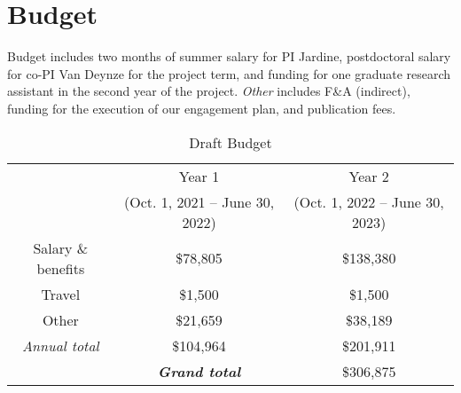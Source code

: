 \documentclass[12pt]{elsarticle}
\begin{document}
	\section{Budget}
	Budget includes two months of summer salary for PI Jardine, postdoctoral salary for co-PI Van Deynze for the project term, and funding for one graduate research assistant in the second year of the project. \textit{Other} includes F\&A (indirect), funding for the execution of our engagement plan,  and publication fees.
	
		\begin{table}[h]
				\caption{Draft Budget} 	
			\centering
				\begin{tabular}{ c|cc } %
			\hline
			 & Year 1  & Year 2  \\
			 & (Oct. 1, 2021 -- June 30, 2022) & (Oct. 1, 2022 -- June 30, 2023) \\
			 \hline
			\rowcolor[gray]{.9} Salary \& benefits &  \$78,805  & \$138,380 \\ 
			Travel & \$1,500 & \$1,500 \\
			\rowcolor[gray]{.9} Other & \$21,659 & \$38,189 \\
			\hline
			\textit{Annual total} & \$104,964 & \$201,911 \\
			\hline
			& \textbf{\textit{Grand total}} & \$306,875 \\
			\hline
		\end{tabular}
	\end{table}

	
	
	
	\clearpage
	\footnotesize
	
\end{document}
